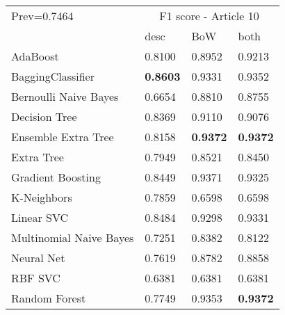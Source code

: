 \begin{tabular}{|l|l|l|l| }
\hline
Prev=0.7464 &  \multicolumn{3}{c|}{F1 score - Article 10} \\
\cline{2-4} & desc & BoW & both \\ \hline
AdaBoost                & 0.8100 & 0.8952 & 0.9213\\
BaggingClassifier       & {\bf 0.8603} & 0.9331 & 0.9352\\
Bernoulli Naive Bayes   & 0.6654 & 0.8810 & 0.8755\\
Decision Tree           & 0.8369 & 0.9110 & 0.9076\\
Ensemble Extra Tree     & 0.8158 & {\bf 0.9372} & {\bf 0.9372}\\
Extra Tree              & 0.7949 & 0.8521 & 0.8450\\
Gradient Boosting       & 0.8449 & 0.9371 & 0.9325\\
K-Neighbors             & 0.7859 & 0.6598 & 0.6598\\
Linear SVC              & 0.8484 & 0.9298 & 0.9331\\
Multinomial Naive Bayes & 0.7251 & 0.8382 & 0.8122\\
Neural Net              & 0.7619 & 0.8782 & 0.8858\\
RBF SVC                 & 0.6381 & 0.6381 & 0.6381\\
Random Forest           & 0.7749 & 0.9353 & {\bf 0.9372}\\
\hline
\end{tabular}